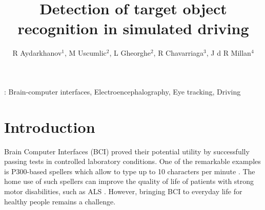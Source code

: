 \documentclass[12pt]{iopart}
\begin{document}
\title[]{Detection of target object recognition in simulated driving}

\author{R Aydarkhanov$^1$,
M Uscumlic$^2$,
L Gheorghe$^2$,
R Chavarriaga$^3$,
J d R Millan$^4$}


\address{$^1$EPFL, Switzerland}
\address{$^2$EPFL, Switzerland}
\address{$^3$EPFL, Switzerland}
\address{$^4$TU Austin, USA}
\vspace{10pt}

\begin{abstract}
\end{abstract}

%
\vspace{2pc}
: Brain-computer interfaces, Electroencephalography, Eye tracking, Driving
%
%
% 
%




\section{Introduction}
\label{sec:intro}

Brain Computer Interfaces (BCI) proved their potential utility 
by successfully passing tests in controlled laboratory conditions.
One of the remarkable examples is P300-based spellers
which allow to type up to 10 characters per minute \cite{rezeika_braincomputer_2018}.
The home use of such spellers can improve the quality of life
of patients with strong motor disabilities, such as ALS \cite{sellers_brain-computer_2010,holz_long-term_2015}.
However, bringing BCI to everyday life for healthy people
remains a challenge.
\end{document}
